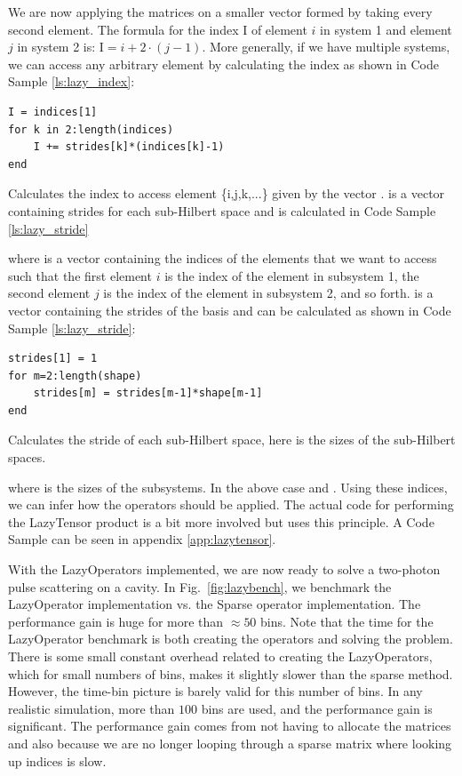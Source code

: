 We are now applying the matrices on a smaller vector formed by taking every second element. The formula for the index $\mathrm{I}$ of element $i$ in system 1 and element $j$ in system 2 is: $\mathrm{I} = i + 2\cdot(j-1)$. More generally, if we have multiple systems, we can access any arbitrary element by calculating the index as shown in Code Sample \ref{ls:lazy_index}:
\begin{listing}[H]
\begin{verbatim}
I = indices[1]
for k in 2:length(indices)
    I += strides[k]*(indices[k]-1)
end
\end{verbatim}
\caption{Calculates the index  to access element \{i,j,k,...\} given by the vector .  is a vector containing strides for each sub-Hilbert space and is calculated in Code Sample \ref{ls:lazy_stride} }
\label{ls:lazy_index}
\end{listing}
where  is a vector containing the indices of the elements that we want to access such that the first element $i$ is the index of the element in subsystem 1, the second element $j$ is the index of the element in subsystem 2, and so forth.  is a vector containing the strides of the basis and can be calculated as shown in Code Sample \ref{ls:lazy_stride}:
\begin{listing}[H]
\begin{verbatim}
strides[1] = 1
for m=2:length(shape)
    strides[m] = strides[m-1]*shape[m-1]
end
\end{verbatim}
\caption{Calculates the stride of each sub-Hilbert space, here  is the sizes of the sub-Hilbert spaces. }
\label{ls:lazy_stride}
\end{listing}
where  is the sizes of the subsystems. In the above case  and . Using these indices, we can infer how the operators should be applied. The actual code for performing the LazyTensor product is a bit more involved but uses this principle. A Code Sample can be seen in appendix \ref{app:lazytensor}.

With the LazyOperators implemented, we are now ready to solve a two-photon pulse scattering on a cavity. In Fig.~\ref{fig:lazybench}, we benchmark the LazyOperator implementation vs. the Sparse operator implementation. The performance gain is huge for more than $\approx 50$ bins. Note that the time for the LazyOperator benchmark is both creating the operators and solving the problem. There is some small constant overhead related to creating the LazyOperators, which for small numbers of bins, makes it slightly slower than the sparse method. However, the time-bin picture is barely valid for this number of bins. In any realistic simulation, more than $100$ bins are used, and the performance gain is significant. The performance gain comes from not having to allocate the matrices and also because we are no longer looping through a sparse matrix where looking up indices is slow.     

